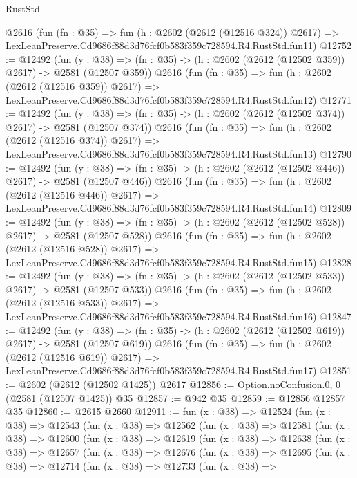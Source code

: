 \begin{lexlean}{RustStd}
\begin{coremodule}
    @2616
    (fun (fn : @35) =>
    fun (h : @2602 (@2612 (@12516 @324)) @2617) =>
    LexLeanPreserve.Cd9686f88d3d76fcf0b583f359c728594.R4.RustStd.fun11)
@12752 := @12492
    (fun (y : @38) => (fn : @35) -> (h : @2602 (@2612 (@12502 @359)) @2617) -> @2581 (@12507 @359))
    @2616
    (fun (fn : @35) =>
    fun (h : @2602 (@2612 (@12516 @359)) @2617) =>
    LexLeanPreserve.Cd9686f88d3d76fcf0b583f359c728594.R4.RustStd.fun12)
@12771 := @12492
    (fun (y : @38) => (fn : @35) -> (h : @2602 (@2612 (@12502 @374)) @2617) -> @2581 (@12507 @374))
    @2616
    (fun (fn : @35) =>
    fun (h : @2602 (@2612 (@12516 @374)) @2617) =>
    LexLeanPreserve.Cd9686f88d3d76fcf0b583f359c728594.R4.RustStd.fun13)
@12790 := @12492
    (fun (y : @38) => (fn : @35) -> (h : @2602 (@2612 (@12502 @446)) @2617) -> @2581 (@12507 @446))
    @2616
    (fun (fn : @35) =>
    fun (h : @2602 (@2612 (@12516 @446)) @2617) =>
    LexLeanPreserve.Cd9686f88d3d76fcf0b583f359c728594.R4.RustStd.fun14)
@12809 := @12492
    (fun (y : @38) => (fn : @35) -> (h : @2602 (@2612 (@12502 @528)) @2617) -> @2581 (@12507 @528))
    @2616
    (fun (fn : @35) =>
    fun (h : @2602 (@2612 (@12516 @528)) @2617) =>
    LexLeanPreserve.Cd9686f88d3d76fcf0b583f359c728594.R4.RustStd.fun15)
@12828 := @12492
    (fun (y : @38) => (fn : @35) -> (h : @2602 (@2612 (@12502 @533)) @2617) -> @2581 (@12507 @533))
    @2616
    (fun (fn : @35) =>
    fun (h : @2602 (@2612 (@12516 @533)) @2617) =>
    LexLeanPreserve.Cd9686f88d3d76fcf0b583f359c728594.R4.RustStd.fun16)
@12847 := @12492
    (fun (y : @38) => (fn : @35) -> (h : @2602 (@2612 (@12502 @619)) @2617) -> @2581 (@12507 @619))
    @2616
    (fun (fn : @35) =>
    fun (h : @2602 (@2612 (@12516 @619)) @2617) =>
    LexLeanPreserve.Cd9686f88d3d76fcf0b583f359c728594.R4.RustStd.fun17)
@12851 := @2602 (@2612 (@12502 @1425)) @2617
@12856 := Option.noConfusion.{0, 0} (@2581 (@12507 @1425)) @35
@12857 := @942 @35
@12859 := @12856 @12857 @35
@12860 := @2615 @2660
@12911 := fun (x : @38) =>
  @12524
    (fun (x : @38) =>
    @12543
      (fun (x : @38) =>
      @12562
        (fun (x : @38) =>
        @12581
          (fun (x : @38) =>
          @12600
            (fun (x : @38) =>
            @12619
              (fun (x : @38) =>
              @12638
                (fun (x : @38) =>
                @12657
                  (fun (x : @38) =>
                  @12676
                    (fun (x : @38) =>
                    @12695
                      (fun (x : @38) =>
                      @12714
                        (fun (x : @38) =>
                        @12733
                          (fun (x : @38) =>

\end{coremodule}
\end{lexlean}
